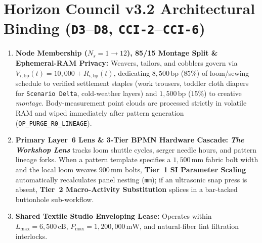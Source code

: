 \section{Horizon Council v3.2 Architectural Binding (\texttt{D3}--\texttt{D8}, \texttt{CCI-2}--\texttt{CCI-6})}
\begin{enumerate}
    \item \textbf{Node Membership ($N_s = 1 \to 12$), 85/15 Montage Split \& Ephemeral-RAM Privacy:} Weavers, tailors, and cobblers govern via $V_{i,\mathrm{bp}}(t) = 10{,}000 + R_{i,\mathrm{bp}}(t)$, dedicating $8{,}500\,\mathrm{bp}$ ($85\%$) of loom/sewing schedule to verified settlement staples (work trousers, toddler cloth diapers for \texttt{Scenario Delta}, cold-weather layers) and $1{,}500\,\mathrm{bp}$ ($15\%$) to creative \textit{montage}. Body-measurement point clouds are processed strictly in volatile RAM and wiped immediately after pattern generation (\texttt{OP\_PURGE\_R0\_LINEAGE}).
    \item \textbf{Primary Layer~6 Lens \& 3-Tier BPMN Hardware Cascade:} \textbf{\textit{The Workshop Lens}} tracks loom shuttle cycles, serger needle hours, and pattern lineage forks. When a pattern template specifies a $1{,}500\,\mathrm{mm}$ fabric bolt width and the local loom weaves $900\,\mathrm{mm}$ bolts, \textbf{Tier~1 SI Parameter Scaling} automatically recalculates panel nesting (\texttt{mm}); if an ultrasonic snap press is absent, \textbf{Tier~2 Macro-Activity Substitution} splices in a bar-tacked buttonhole sub-workflow.
    \item \textbf{Shared Textile Studio Enveloping Lease:} Operates within $L_{\max} = 6{,}500\,\mathrm{cB}$, $P_{\max} = 1{,}200{,}000\,\mathrm{mW}$, and natural-fiber lint filtration interlocks.
\end{enumerate}

